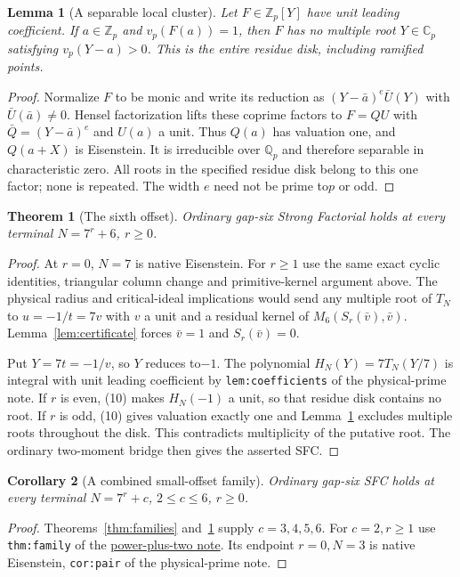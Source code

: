 \documentclass[11pt]{article}
\newtheorem{lemma}{Lemma}\newtheorem{theorem}{Theorem}
\newtheorem{corollary}[theorem]{Corollary}
\begin{document}
\begin{lemma}[A separable local cluster]\label{lem:local-cluster}
Let $F\in\mathbb Z_p[Y]$ have unit leading coefficient.
If $a\in\mathbb Z_p$ and $v_p(F(a))=1$, then $F$ has no
multiple root $Y\in\mathbb C_p$ satisfying $v_p(Y-a)>0$.
This is the entire residue disk, including ramified points.
\end{lemma}
\begin{proof}
Normalize $F$ to be monic and write its reduction as
$(Y-\bar a)^e\bar U(Y)$ with $\bar U(\bar a)\ne0$.
Hensel factorization lifts these coprime factors to
$F=Q U$ with $\bar Q=(Y-\bar a)^e$ and $U(a)$ a unit.
Thus $Q(a)$ has valuation one, and $Q(a+X)$ is Eisenstein.
It is irreducible over $\mathbb Q_p$ and therefore separable
in characteristic zero. All roots in the specified residue disk
belong to this one factor; none is repeated.
The width $e$ need not be prime to$p$ or odd.
\end{proof}

\begin{theorem}[The sixth offset]\label{thm:offset-six}
Ordinary gap-six Strong Factorial holds at every terminal
$N=7^r+6$, $r\ge0$.
\end{theorem}
\begin{proof}
At $r=0$, $N=7$ is native Eisenstein.
For $r\ge1$ use the same exact cyclic identities, triangular
column change and primitive-kernel argument above.
The physical radius and critical-ideal implications would send
any multiple root of $T_N$ to $u=-1/t=7v$ with $v$ a unit
and a residual kernel of $M_6(S_r(\bar v),\bar v)$.
Lemma~\ref{lem:certificate} forces $\bar v=1$ and $S_r(\bar v)=0$.

Put $Y=7t=-1/v$, so $Y$ reduces to$-1$.
The polynomial $H_N(Y)=7T_N(Y/7)$ is integral with unit
leading coefficient by \texttt{lem:coefficients} of the
physical-prime note.
If $r$ is even, (10) makes $H_N(-1)$ a unit, so that residue
disk contains no root.
If $r$ is odd, (10) gives valuation exactly one and
Lemma~\ref{lem:local-cluster} excludes multiple roots throughout
the disk. This contradicts multiplicity of the putative root.
The ordinary two-moment bridge then gives the asserted SFC.
\end{proof}

\begin{corollary}[A combined small-offset family]\label{cor:small-offsets}
Ordinary gap-six SFC holds at every terminal $N=7^r+c$,
$2\le c\le6$, $r\ge0$.
\end{corollary}
\begin{proof}
Theorems~\ref{thm:families} and~\ref{thm:offset-six}
supply $c=3,4,5,6$.
For $c=2,r\ge1$ use \texttt{thm:family} of the
\href{GAP_SIX_POWER_PLUS_TWO_SFC.tex}{power-plus-two note}.
Its endpoint $r=0,N=3$ is native Eisenstein, \texttt{cor:pair}
of the physical-prime note.
\end{proof}
\end{document}
